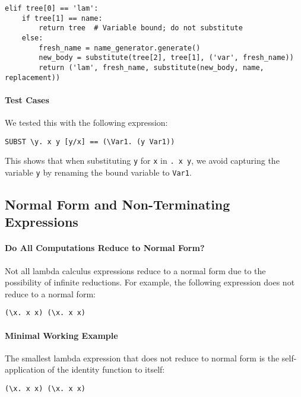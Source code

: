 \documentclass{article}
\theoremstyle{theorem}
\theoremstyle{definition}
\theoremstyle{remark}
\begin{document}
\begin{verbatim}
elif tree[0] == 'lam':
    if tree[1] == name:
        return tree  # Variable bound; do not substitute
    else:
        fresh_name = name_generator.generate()
        new_body = substitute(tree[2], tree[1], ('var', fresh_name))
        return ('lam', fresh_name, substitute(new_body, name, replacement))
\end{verbatim}

\paragraph{Test Cases}

We tested this with the following expression:

\begin{verbatim}
SUBST \y. x y [y/x] == (\Var1. (y Var1))
\end{verbatim}

This shows that when substituting \texttt{y} for \texttt{x} in \texttt{\y. x y}, we avoid capturing the variable \texttt{y} by renaming the bound variable to \texttt{Var1}.

\subsection{Normal Form and Non-Terminating Expressions}

\paragraph{Do All Computations Reduce to Normal Form?}

Not all lambda calculus expressions reduce to a normal form due to the possibility of infinite reductions. For example, the following expression does not reduce to a normal form:

\begin{verbatim}
(\x. x x) (\x. x x)
\end{verbatim}

\paragraph{Minimal Working Example}

The smallest lambda expression that does not reduce to normal form is the self-application of the identity function to itself:

\begin{verbatim}
(\x. x x) (\x. x x)
\end{verbatim}
\end{document}

